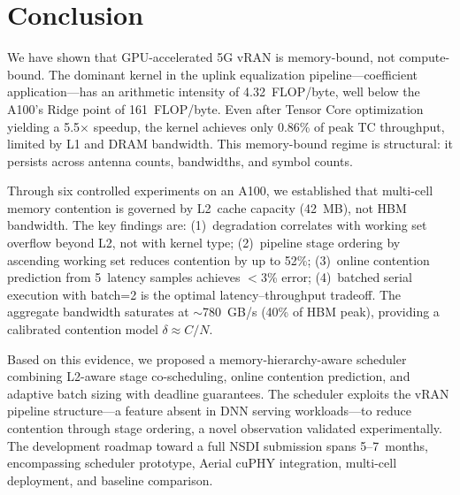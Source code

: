 \section{Conclusion}
\label{sec:conclusion}

We have shown that GPU-accelerated 5G vRAN is memory-bound, not compute-bound. The dominant kernel in the uplink equalization pipeline---coefficient application---has an arithmetic intensity of 4.32~FLOP/byte, well below the A100's Ridge point of 161~FLOP/byte. Even after Tensor Core optimization yielding a 5.5$\times$ speedup, the kernel achieves only 0.86\% of peak TC throughput, limited by L1 and DRAM bandwidth. This memory-bound regime is structural: it persists across antenna counts, bandwidths, and symbol counts.

Through six controlled experiments on an A100, we established that multi-cell memory contention is governed by L2~cache capacity (42~MB), not HBM bandwidth. The key findings are: (1)~degradation correlates with working set overflow beyond L2, not with kernel type; (2)~pipeline stage ordering by ascending working set reduces contention by up to 52\%; (3)~online contention prediction from 5~latency samples achieves $<$3\% error; (4)~batched serial execution with batch=2 is the optimal latency--throughput tradeoff. The aggregate bandwidth saturates at $\sim$780~GB/s (40\% of HBM peak), providing a calibrated contention model $\delta \approx C/N$.

Based on this evidence, we proposed a memory-hierarchy-aware scheduler combining L2-aware stage co-scheduling, online contention prediction, and adaptive batch sizing with deadline guarantees. The scheduler exploits the vRAN pipeline structure---a feature absent in DNN serving workloads---to reduce contention through stage ordering, a novel observation validated experimentally. The development roadmap toward a full NSDI submission spans 5--7~months, encompassing scheduler prototype, Aerial cuPHY integration, multi-cell deployment, and baseline comparison.
